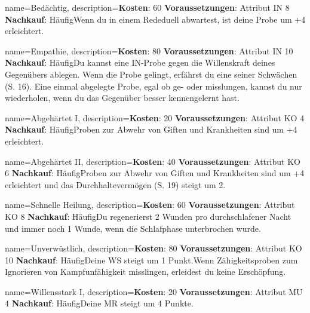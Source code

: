 {
    name={Bedächtig},
    description={\textbf{Kosten}: 60 \textbf{Voraussetzungen}: Attribut IN 8 \textbf{Nachkauf}: Häufig\newline Wenn du in einem Rededuell abwartest, ist deine Probe um +4 erleichtert.}
}


{
    name={Empathie},
    description={\textbf{Kosten}: 80 \textbf{Voraussetzungen}: Attribut IN 10 \textbf{Nachkauf}: Häufig\newline Du kannst eine IN-Probe gegen die Willenskraft deines Gegenübers ablegen. Wenn die Probe gelingt, erfährst du eine seiner Schwächen (S. 16). Eine einmal abgelegte Probe, egal ob ge- oder misslungen, kannst du nur wiederholen, wenn du das Gegenüber besser kennengelernt hast.}
}


{
    name={Abgehärtet I},
    description={\textbf{Kosten}: 20 \textbf{Voraussetzungen}: Attribut KO 4 \textbf{Nachkauf}: Häufig\newline Proben zur Abwehr von Giften und Krankheiten sind um +4 erleichtert.}
}


{
    name={Abgehärtet II},
    description={\textbf{Kosten}: 40 \textbf{Voraussetzungen}: Attribut KO 6 \textbf{Nachkauf}: Häufig\newline Proben zur Abwehr von Giften und Krankheiten sind um +4 erleichtert und das Durchhaltevermögen (S. 19) steigt um 2.}
}


{
    name={Schnelle Heilung},
    description={\textbf{Kosten}: 60 \textbf{Voraussetzungen}: Attribut KO 8 \textbf{Nachkauf}: Häufig\newline Du regenerierst 2 Wunden pro durchschlafener Nacht und immer noch 1 Wunde, wenn die Schlafphase unterbrochen wurde.}
}


{
    name={Unverwüstlich},
    description={\textbf{Kosten}: 80 \textbf{Voraussetzungen}: Attribut KO 10 \textbf{Nachkauf}: Häufig\newline Deine WS steigt um 1 Punkt.\newline Wenn Zähigkeitsproben zum Ignorieren von Kampfunfähigkeit misslingen, erleidest du keine Erschöpfung.}
}


{
    name={Willensstark I},
    description={\textbf{Kosten}: 20 \textbf{Voraussetzungen}: Attribut MU 4 \textbf{Nachkauf}: Häufig\newline Deine MR steigt um 4 Punkte.}
}


